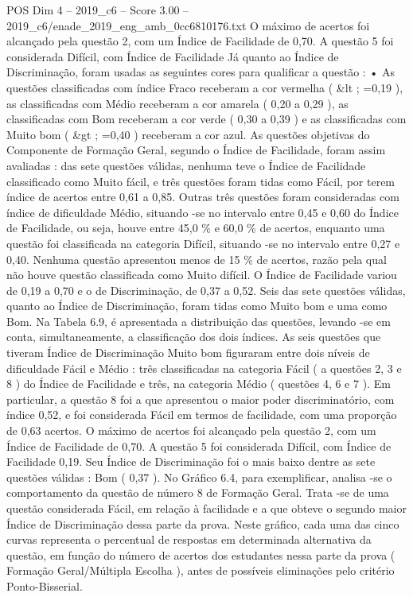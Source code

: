\begin{textsample}{POS Dim 4 – 2019\_c6 – Score 3.00 – 2019\_c6/enade\_2019\_eng\_amb\_0cc6810176.txt}
O máximo de acertos foi alcançado pela questão 2, com um Índice de Facilidade de 0,70.
A questão 5 foi considerada Difícil, com Índice de Facilidade Já quanto ao Índice de Discriminação, foram usadas as seguintes cores para qualificar a questão : • As questões classificadas com índice Fraco receberam a cor vermelha ( \&lt ; =0,19 ), as classificadas com Médio receberam a cor amarela ( 0,20 a 0,29 ), as classificadas com Bom receberam a cor verde ( 0,30 a 0,39 ) e as classificadas com Muito bom ( \&gt ; =0,40 ) receberam a cor azul.
As questões objetivas do Componente de Formação Geral, segundo o Índice de Facilidade, foram assim avaliadas : das sete questões válidas, nenhuma teve o Índice de Facilidade classificado como Muito fácil, e três questões foram tidas como Fácil, por terem índice de acertos entre 0,61 a 0,85.
Outras três questões foram consideradas com índice de dificuldade Médio, situando -se no intervalo entre 0,45 e 0,60 do Índice de Facilidade, ou seja, houve entre 45,0 \% e 60,0 \% de acertos, enquanto uma questão foi classificada na categoria Difícil, situando -se no intervalo entre 0,27 e 0,40.
Nenhuma questão apresentou menos de 15 \% de acertos, razão pela qual não houve questão classificada como Muito difícil.
O Índice de Facilidade variou de 0,19 a 0,70 e o de Discriminação, de 0,37 a 0,52.
Seis das sete questões válidas, quanto ao Índice de Discriminação, foram tidas como Muito bom e uma como Bom.
Na Tabela 6.9, é apresentada a distribuição das questões, levando -se em conta, simultaneamente, a classificação dos dois índices.
As seis questões que tiveram Índice de Discriminação Muito bom figuraram entre dois níveis de dificuldade Fácil e Médio : três classificadas na categoria Fácil ( a questões 2, 3 e 8 ) do Índice de Facilidade e três, na categoria Médio ( questões 4, 6 e 7 ).
Em particular, a questão 8 foi a que apresentou o maior poder discriminatório, com índice 0,52, e foi considerada Fácil em termos de facilidade, com uma proporção de 0,63 acertos.
O máximo de acertos foi alcançado pela questão 2, com um Índice de Facilidade de 0,70.
A questão 5 foi considerada Difícil, com Índice de Facilidade 0,19.
Seu Índice de Discriminação foi o mais baixo dentre as sete questões válidas : Bom ( 0,37 ).
No Gráfico 6.4, para exemplificar, analisa -se o comportamento da questão de número 8 de Formação Geral.
Trata -se de uma questão considerada Fácil, em relação à facilidade e a que obteve o segundo maior Índice de Discriminação dessa parte da prova.
Neste gráfico, cada uma das cinco curvas representa o percentual de respostas em determinada alternativa da questão, em função do número de acertos dos estudantes nessa parte da prova ( Formação Geral/Múltipla Escolha ), antes de possíveis eliminações pelo critério Ponto-Bisserial.

\end{textsample}
